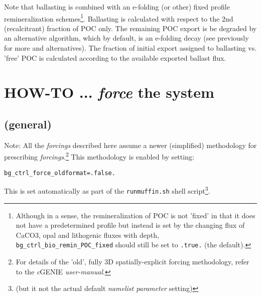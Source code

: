\documentclass[11pt,fleqn]{book} %
\begin{document}
Note that ballasting is combined with an e-folding (or other) fixed profile remineralization schemes\footnote{Although in a sense, the remineralization of POC is not 'fixed' in that it does not have a predetermined profile but instead is set by the changing flux of CaCO3, opal and lithogenic fluxes with depth, \texttt{bg\_ctrl\_bio\_remin\_POC\_fixed} should still be set to \texttt{.true.} (the default).}. Ballasting is calculated with respect to the 2nd (recalcitrant) fraction of POC only. The remaining POC export is be degraded by an alternative algorithm, which by default, is an e-folding decay (see previously for more and alternatives). The fraction of initial export assigned to ballasting vs. 'free' POC is calculated according to the available exported ballast flux.


\newpage


\section{HOW-TO ...  \textit{force} the system}

%
\subsection*{(general)}
\vspace{1mm}

Note: All the \textit{forcings} described here assume a newer (simplified) methodology for prescribing \textit{forcings}.\footnote{For details of the 'old', fully 3D spatially-explicit forcing methodology, refer to the \textit{c}GENIE \textit{user-manual}.
} This methodology is enabled by setting:
\vspace{-2pt}\small\begin{verbatim}
bg_ctrl_force_oldformat=.false.
\end{verbatim}\vspace{-2pt}\normalsize
This is set automatically as part of the \texttt{runmuffin.sh} shell script\footnote{(but it not the actual default \textit{namelist parameter} setting)}.
\end{document}
